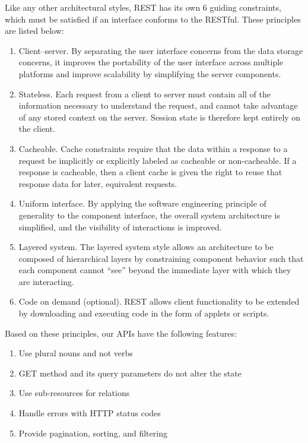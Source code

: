 Like any other architectural styles, REST has its own 6 guiding constraints, which must be satisfied if an interface conforms to the RESTful. These principles are listed below:
\begin{enumerate}
  \item Client–server. By separating the user interface concerns from the data storage concerns, it improves the portability of the user interface across multiple platforms and improve scalability by simplifying the server components.
  \item Stateless. Each request from a client to server must contain all of the information necessary to understand the request, and cannot take advantage of any stored context on the server. Session state is therefore kept entirely on the client.
  \item Cacheable. Cache constraints require that the data within a response to a request be implicitly or explicitly labeled as cacheable or non-cacheable. If a response is cacheable, then a client cache is given the right to reuse that response data for later, equivalent requests.
  \item Uniform interface. By applying the software engineering principle of generality to the component interface, the overall system architecture is simplified, and the visibility of interactions is improved.
  \item Layered system. The layered system style allows an architecture to be composed of hierarchical layers by constraining component behavior such that each component cannot ``see'' beyond the immediate layer with which they are interacting.
  \item Code on demand (optional). REST allows client functionality to be extended by downloading and executing code in the form of applets or scripts.
\end{enumerate}

Based on these principles, our APIs have the following features:

\begin{enumerate}
  \item Use plural nouns and not verbs
  \item GET method and its query parameters do not alter the state
  \item Use sub-resources for relations
  \item Handle errors with HTTP status codes
  \item Provide pagination, sorting, and filtering
\end{enumerate}

